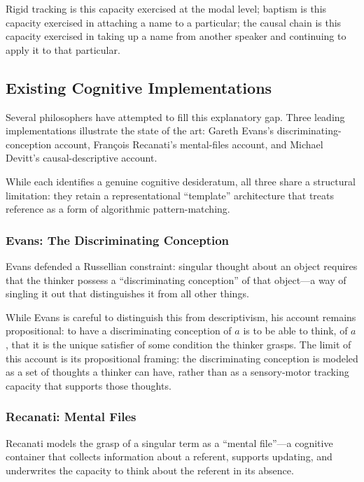 \documentclass[12pt,a4paper]{article}
\begin{document}
Rigid tracking is this capacity exercised at the modal level; baptism is this capacity exercised in attaching a name to a particular; the causal chain is this capacity exercised in taking up a name from another speaker and continuing to apply it to that particular.

\subsection{Existing Cognitive Implementations}\label{existing-cognitive-implementations}

Several philosophers have attempted to fill this explanatory gap. Three leading implementations illustrate the state of the art: Gareth Evans's discriminating-conception account, François Recanati's mental-files account, and Michael Devitt's causal-descriptive account.

While each identifies a genuine cognitive desideratum, all three share a structural limitation: they retain a representational ``template'' architecture that treats reference as a form of algorithmic pattern-matching.

\subsubsection{Evans: The Discriminating Conception}\label{evans-the-discriminating-conception}

Evans defended a Russellian constraint: singular thought about an object requires that the thinker possess a ``discriminating conception'' of that object---a way of singling it out that distinguishes it from all other things.

While Evans is careful to distinguish this from descriptivism, his account remains propositional: to have a discriminating conception of \(a\) is to be able to think, of \(a\), that it is the unique satisfier of some condition the thinker grasps. The limit of this account is its propositional framing: the discriminating conception is modeled as a set of thoughts a thinker can have, rather than as a sensory-motor tracking capacity that supports those thoughts.

\subsubsection{Recanati: Mental Files}\label{recanati-mental-files}

Recanati models the grasp of a singular term as a ``mental file''---a cognitive container that collects information about a referent, supports updating, and underwrites the capacity to think about the referent in its absence.
\end{document}
